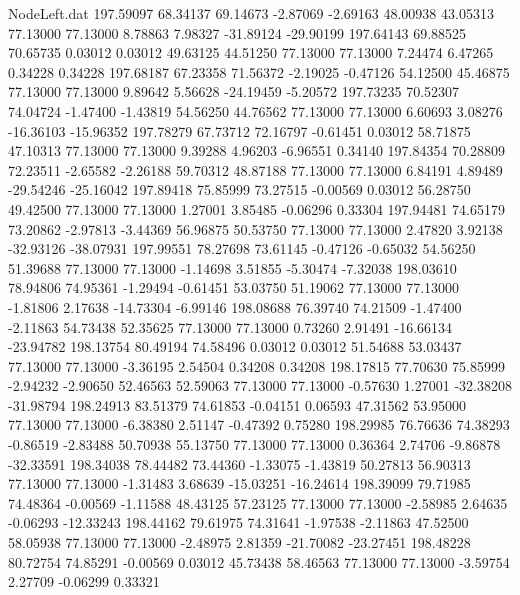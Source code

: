 \begin{filecontents}{NodeLeft.dat}
 197.59097   68.34137   69.14673    -2.87069   -2.69163   48.00938   43.05313   77.13000   77.13000    8.78863    7.98327  -31.89124  -29.90199
 197.64143   69.88525   70.65735     0.03012    0.03012   49.63125   44.51250   77.13000   77.13000    7.24474    6.47265    0.34228    0.34228
 197.68187   67.23358   71.56372    -2.19025   -0.47126   54.12500   45.46875   77.13000   77.13000    9.89642    5.56628  -24.19459   -5.20572
 197.73235   70.52307   74.04724    -1.47400   -1.43819   54.56250   44.76562   77.13000   77.13000    6.60693    3.08276  -16.36103  -15.96352
 197.78279   67.73712   72.16797    -0.61451    0.03012   58.71875   47.10313   77.13000   77.13000    9.39288    4.96203   -6.96551    0.34140
 197.84354   70.28809   72.23511    -2.65582   -2.26188   59.70312   48.87188   77.13000   77.13000    6.84191    4.89489  -29.54246  -25.16042
 197.89418   75.85999   73.27515    -0.00569    0.03012   56.28750   49.42500   77.13000   77.13000    1.27001    3.85485   -0.06296    0.33304
 197.94481   74.65179   73.20862    -2.97813   -3.44369   56.96875   50.53750   77.13000   77.13000    2.47820    3.92138  -32.93126  -38.07931
 197.99551   78.27698   73.61145    -0.47126   -0.65032   54.56250   51.39688   77.13000   77.13000   -1.14698    3.51855   -5.30474   -7.32038
 198.03610   78.94806   74.95361    -1.29494   -0.61451   53.03750   51.19062   77.13000   77.13000   -1.81806    2.17638  -14.73304   -6.99146
 198.08688   76.39740   74.21509    -1.47400   -2.11863   54.73438   52.35625   77.13000   77.13000    0.73260    2.91491  -16.66134  -23.94782
 198.13754   80.49194   74.58496     0.03012    0.03012   51.54688   53.03437   77.13000   77.13000   -3.36195    2.54504    0.34208    0.34208
 198.17815   77.70630   75.85999    -2.94232   -2.90650   52.46563   52.59063   77.13000   77.13000   -0.57630    1.27001  -32.38208  -31.98794
 198.24913   83.51379   74.61853    -0.04151    0.06593   47.31562   53.95000   77.13000   77.13000   -6.38380    2.51147   -0.47392    0.75280
 198.29985   76.76636   74.38293    -0.86519   -2.83488   50.70938   55.13750   77.13000   77.13000    0.36364    2.74706   -9.86878  -32.33591
 198.34038   78.44482   73.44360    -1.33075   -1.43819   50.27813   56.90313   77.13000   77.13000   -1.31483    3.68639  -15.03251  -16.24614
 198.39099   79.71985   74.48364    -0.00569   -1.11588   48.43125   57.23125   77.13000   77.13000   -2.58985    2.64635   -0.06293  -12.33243
 198.44162   79.61975   74.31641    -1.97538   -2.11863   47.52500   58.05938   77.13000   77.13000   -2.48975    2.81359  -21.70082  -23.27451
 198.48228   80.72754   74.85291    -0.00569    0.03012   45.73438   58.46563   77.13000   77.13000   -3.59754    2.27709   -0.06299    0.33321

\end{filecontents}
